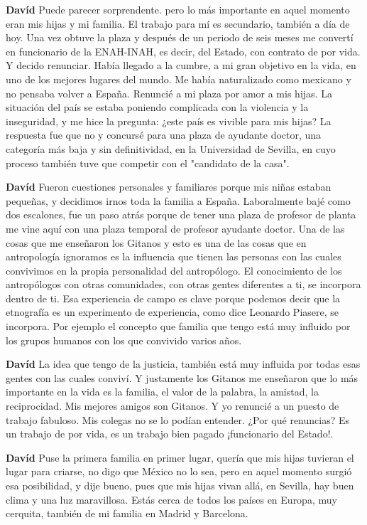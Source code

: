 \documentclass[
  spanish,
  11pt,
  a4paper,
]{scrbook}
\newenvironment{transcripcion}{
    \begin{list}{}{
        \setlength{\leftmargin}{1.5em}  %
        \setlength{\rightmargin}{0em}
        \setlength{\itemsep}{0.2em}     %
        \setlength{\parsep}{0.0em}
        \setlength{\listparindent}{0pt}
    }
}{
    \end{list}
}
\newcommand{\personaje}[1]{\textbf{#1}\quad}
\begin{document}
\begin{transcripcion}
\item \personaje{Davíd} Puede parecer sorprendente. pero lo más importante en aquel momento eran mis hijas y mi familia. El trabajo para mí es secundario, también a día de hoy. Una vez obtuve la plaza y después de un periodo de seis meses me convertí en funcionario de la ENAH-INAH, es decir, del Estado, con contrato de por vida. Y decido renunciar. Había llegado a la cumbre, a mi gran objetivo en la vida, en uno de los mejores lugares del mundo. Me había naturalizado como mexicano y no pensaba volver a España. Renuncié a mi plaza por amor a mis hijas. La situación del país se estaba poniendo complicada con la violencia y la inseguridad, y me hice la pregunta: ¿este país es vivible para mis hijas? La respuesta fue que no y concursé para una plaza de ayudante doctor, una categoría más baja y sin definitividad, en la Universidad de Sevilla, en cuyo proceso también tuve que competir con el "candidato de la casa".

\item \personaje{Davíd} Fueron cuestiones personales y familiares porque mis niñas estaban pequeñas, y decidimos irnos toda la familia a España. Laboralmente bajé como dos escalones, fue un paso atrás porque de tener una plaza de profesor de planta me vine aquí con una plaza temporal de profesor ayudante doctor. Una de las cosas que me enseñaron los Gitanos y esto es una de las cosas que en antropología ignoramos es la influencia que tienen las personas con las cuales convivimos en la propia personalidad del antropólogo. El conocimiento de los antropólogos con otras comunidades, con otras gentes diferentes a ti, se incorpora dentro de ti. Esa experiencia de campo es clave porque podemos decir que la etnografía es un experimento de experiencia, como dice Leonardo Piasere, se incorpora. Por ejemplo el concepto que familia que tengo está muy influido por los grupos humanos con los que convivido varios años.

\item \personaje{Davíd} La idea que tengo de la justicia, también está muy influida por todas esas gentes con las cuales conviví. Y justamente los Gitanos me enseñaron que lo más importante en la vida es la familia, el valor de la palabra, la amistad, la reciprocidad. Mis mejores amigos son Gitanos. Y yo renuncié a un puesto de trabajo fabuloso. Mis colegas no se lo podían entender. ¿Por qué renuncias? Es un trabajo de por vida, es un trabajo bien pagado ¡funcionario del Estado!.

\item \personaje{Davíd} Puse la primera familia en primer lugar, quería que mis hijas tuvieran el lugar para criarse, no digo que México no lo sea, pero en aquel momento surgió esa posibilidad, y dije bueno, pues que mis hijas vivan allá, en Sevilla, hay buen clima y una luz maravillosa. Estás cerca de todos los países en Europa, muy cerquita, también de mi familia en Madrid y Barcelona.


\end{transcripcion}
\end{document}
